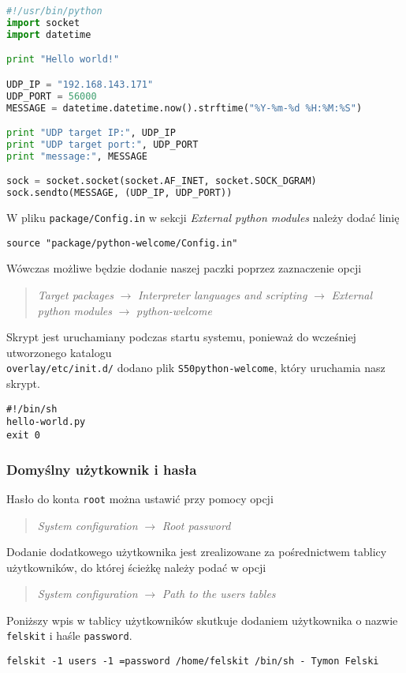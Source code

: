 \documentclass[10pt,a4paper]{article}
\begin{document}
\begin{lstlisting}[style=bash, caption={Zawartość pliku hello-world.py}, language=python]
#!/usr/bin/python
import socket
import datetime

print "Hello world!"

UDP_IP = "192.168.143.171"
UDP_PORT = 56000
MESSAGE = datetime.datetime.now().strftime("%Y-%m-%d %H:%M:%S")

print "UDP target IP:", UDP_IP
print "UDP target port:", UDP_PORT
print "message:", MESSAGE

sock = socket.socket(socket.AF_INET, socket.SOCK_DGRAM)
sock.sendto(MESSAGE, (UDP_IP, UDP_PORT))
\end{lstlisting}
W pliku \texttt{package/Config.in} w sekcji \textit{External python modules} należy dodać linię
\begin{lstlisting}[style=bash]
source "package/python-welcome/Config.in"
\end{lstlisting}
Wówczas możliwe będzie dodanie naszej paczki poprzez zaznaczenie opcji
\begin{quote}
\textit{Target packages} $\rightarrow$ \textit{Interpreter languages and scripting} $\rightarrow$ \textit{External python modules} $\rightarrow$ \textit{python-welcome}
\end{quote}
Skrypt jest uruchamiany podczas startu systemu, ponieważ do wcześniej utworzonego katalogu\\
\texttt{overlay/etc/init.d/} dodano plik \texttt{S50python-welcome}, który uruchamia nasz skrypt.
\begin{lstlisting}[style=bash, caption={Zawartość pliku S50python-welcome}]
#!/bin/sh
hello-world.py
exit 0
\end{lstlisting}
\subsubsection{Domyślny użytkownik i hasła}
Hasło do konta \texttt{root} można ustawić przy pomocy opcji
\begin{quote}
\textit{System configuration} $\rightarrow$ \textit{Root password}
\end{quote}
Dodanie dodatkowego użytkownika jest zrealizowane za pośrednictwem tablicy użytkowników, do której ścieżkę należy podać w opcji
\begin{quote}
\textit{System configuration} $\rightarrow$ \textit{Path to the users tables}
\end{quote}
Poniższy wpis w tablicy użytkowników skutkuje dodaniem użytkownika o nazwie \texttt{felskit} i haśle \texttt{password}.
\begin{lstlisting}[style=bash, caption={Zawartość pliku users}]
felskit -1 users -1 =password /home/felskit /bin/sh - Tymon Felski
\end{lstlisting}
\end{document}
